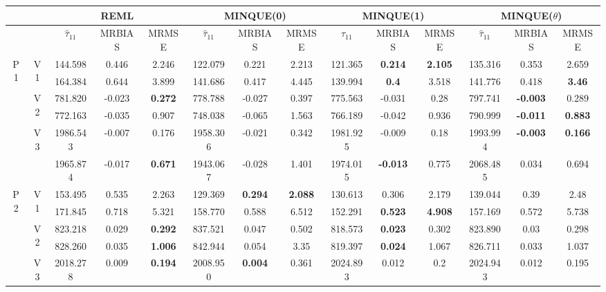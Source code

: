 \documentclass[12pt,a4paper]{article}
\begin{document}
\begin{sidewaystable}[ht]
\centering
{\footnotesize
\begin{tabular}{cc|ccc|ccc|ccc|ccc|}
   & & \multicolumn{3}{c|}{REML}&\multicolumn{3}{c|}{MINQUE(0)}&\multicolumn{3}{c|}{MINQUE(1)}&\multicolumn{3}{c|}{MINQUE($\theta$)}\\ \hline
 &  & $\hat{\tau}_{11}$ & MRBIAS & MRMSE & $\hat{\tau}_{11}$ & MRBIAS & MRMSE & $\hat{\tau}_{11}$ & MRBIAS & MRMSE & $\hat{\tau}_{11}$ & MRBIAS & MRMSE \\ 
  \hline
\multirow{6}{*}{P1} & \multirow{2}{*}{V1} & 144.598 & 0.446 & 2.246 & 122.079 & 0.221 & 2.213 & 121.365 & \textbf{0.214} & \textbf{2.105} & 135.316 & 0.353 & 2.659 \\ 
   &  & 164.384 & 0.644 & 3.899 & 141.686 & 0.417 & 4.445 & 139.994 & \textbf{0.4} & 3.518 & 141.776 & 0.418 & \textbf{3.46} \\ 
   & \multirow{2}{*}{V2} & 781.820 & -0.023 & \textbf{0.272} & 778.788 & -0.027 & 0.397 & 775.563 & -0.031 & 0.28 & 797.741 & \textbf{-0.003} & 0.289 \\ 
   &  & 772.163 & -0.035 & 0.907 & 748.038 & -0.065 & 1.563 & 766.189 & -0.042 & 0.936 & 790.999 & \textbf{-0.011} & \textbf{0.883} \\ 
   & \multirow{2}{*}{V3} & 1986.543 & -0.007 & 0.176 & 1958.306 & -0.021 & 0.342 & 1981.925 & -0.009 & 0.18 & 1993.994 & \textbf{-0.003} & \textbf{0.166} \\ 
   &  & 1965.874 & -0.017 & \textbf{0.671} & 1943.067 & -0.028 & 1.401 & 1974.015 & \textbf{-0.013} & 0.775 & 2068.485 & 0.034 & 0.694 \\ 
   \hline \hline\multirow{6}{*}{P2} & \multirow{2}{*}{V1} & 153.495 & 0.535 & 2.263 & 129.369 & \textbf{0.294} & \textbf{2.088} & 130.613 & 0.306 & 2.179 & 139.044 & 0.39 & 2.48 \\ 
   &  & 171.845 & 0.718 & 5.321 & 158.770 & 0.588 & 6.512 & 152.291 & \textbf{0.523} & \textbf{4.908} & 157.169 & 0.572 & 5.738 \\ 
   & \multirow{2}{*}{V2} & 823.218 & 0.029 & \textbf{0.292} & 837.521 & 0.047 & 0.502 & 818.573 & \textbf{0.023} & 0.302 & 823.890 & 0.03 & 0.298 \\ 
   &  & 828.260 & 0.035 & \textbf{1.006} & 842.944 & 0.054 & 3.35 & 819.397 & \textbf{0.024} & 1.067 & 826.711 & 0.033 & 1.037 \\ 
   & \multirow{2}{*}{V3} & 2018.278 & 0.009 & \textbf{0.194} & 2008.950 & \textbf{0.004} & 0.361 & 2024.893 & 0.012 & 0.2 & 2024.943 & 0.012 & 0.195 \\ 

\end{tabular}}
\end{sidewaystable}
\end{document}

